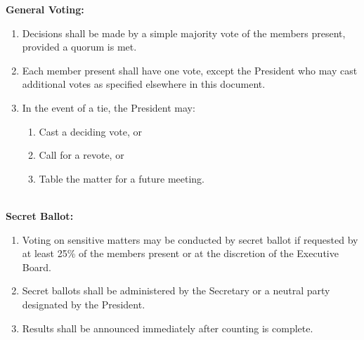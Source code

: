 
\textbf{General Voting:}
\begin{enumerate}[label=\alph*), leftmargin=2em, itemsep=0.3em]
    \item Decisions shall be made by a simple majority vote of the members present, provided a quorum is met.
    \item Each member present shall have one vote, except the President who may cast additional votes as specified elsewhere in this document.
    \item In the event of a tie, the President may:
    \begin{enumerate}[label=\roman*. , leftmargin=2em, itemsep=0.2em]
        \item Cast a deciding vote, or
        \item Call for a revote, or
        \item Table the matter for a future meeting.
    \end{enumerate}
\end{enumerate}
\\
\textbf{Secret Ballot:}
\begin{enumerate}[label=\alph*), leftmargin=2em, itemsep=0.3em]
    \item Voting on sensitive matters may be conducted by secret ballot if requested by at least 25\% of the members present or at the discretion of the Executive Board.
    \item Secret ballots shall be administered by the Secretary or a neutral party designated by the President.
    \item Results shall be announced immediately after counting is complete.
\end{enumerate}
\\

